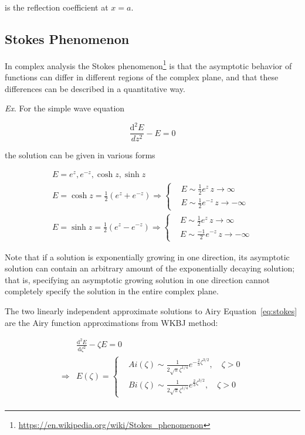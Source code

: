 \documentclass[
  notoc %
]{tufte-book}
\DeclareRobustCommand{\href}[2]{#2\footnote{\url{#1}}}
\begin{document}
is the reflection coefficient at \(x=a\).

\hypertarget{sec:stokes_phenomenon}{%
\subsection{Stokes Phenomenon}\label{sec:stokes_phenomenon}}

In complex analysis the
\href{https://en.wikipedia.org/wiki/Stokes_phenomenon}{Stokes
phenomenon} is that the asymptotic behavior of functions can differ in
different regions of the complex plane, and that these differences can
be described in a quantitative way.

\emph{Ex}. For the simple wave equation

\[
\frac{\mathrm{d}^2 E}{dz^2} - E = 0
\]

the solution can be given in various forms

\[
\begin{aligned}
E=e^z,e^{-z},\cosh{z},\sinh{z} \\
E = \cosh{z}=\frac{1}{2}(e^z+e^{-z}) \Rightarrow
\left\{
\begin{array}{rl}
&E\sim\frac{1}{2}e^z\, z\rightarrow\infty \\
&E\sim\frac{1}{2}e^{-z}\, z\rightarrow-\infty
\end{array} \right. \\
E = \sinh{z}=\frac{1}{2}(e^z-e^{-z}) \Rightarrow
\left\{
\begin{array}{rl}
&E\sim\frac{1}{2}e^z\, z\rightarrow\infty \\
&E\sim\frac{-1}{2}e^{-z}\, z\rightarrow-\infty
\end{array} \right.
\end{aligned}
\]

Note that if a solution is exponentially growing in one direction, its
asymptotic solution can contain an arbitrary amount of the exponentially
decaying solution; that is, specifying an asymptotic growing solution in
one direction cannot completely specify the solution in the entire
complex plane.

The two linearly independent approximate solutions to Airy
Equation~\ref{eq:stokes} are the Airy function approximations from WKBJ
method:

\[
\begin{aligned}
&\frac{\mathrm{d}^2 E}{\mathrm{d}\zeta^2} - \zeta E = 0 \\
\Rightarrow &E(\zeta) = \left\{
\begin{array}{rl}
&Ai(\zeta)\sim \frac{1}{2\sqrt{\pi}\zeta^{1/4}}e^{-\frac{2}{3}\zeta^{3/2}},\quad \zeta>0 \\
&Bi(\zeta)\sim \frac{1}{2\sqrt{\pi}\zeta^{1/4}}e^{\frac{2}{3}\zeta^{3/2}},\quad \zeta>0
\end{array} \right. \\
\end{aligned}
\]
\end{document}
